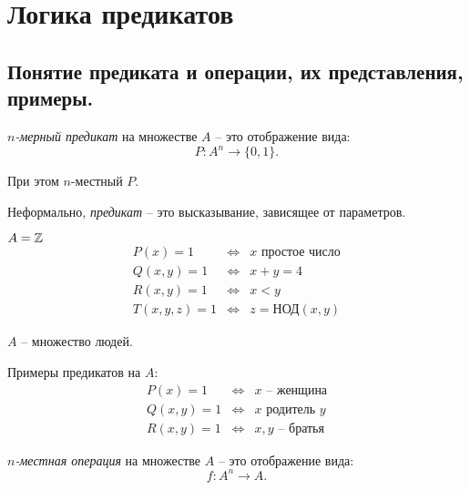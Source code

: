 \section{Логика предикатов}

\subsection{Понятие предиката и операции, их представления, примеры.}

\begin{definition}
    \emph{$ n $-мерный предикат} на множестве $ A $ -- это отображение вида:
    \[
        P: A^n \rightarrow\{0,1\}.
    \]

    При этом $ n $-местный $ P $.

    Неформально, \emph{предикат} -- это высказывание, зависящее от параметров.
\end{definition}

\begin{example}
    $ A = \mathbb{Z} $
    \[
        \begin{array}{lll}
            P(x) = 1     & \iff & x \text{ простое число} \\
            Q(x,y) = 1   & \iff & x + y = 4               \\
            R(x,y) = 1   & \iff & x < y                   \\
            T(x,y,z) = 1 & \iff & z = \text{НОД}(x,y)
        \end{array}
    \]
\end{example}

\begin{example}
    $ A $ -- множество людей.

    Примеры предикатов на $ A $:
    \[
        \begin{array}{lll}
            P(x) = 1   & \iff & x \text{ -- женщина}  \\
            Q(x,y) = 1 & \iff & x \text{ родитель } y \\
            R(x,y) = 1 & \iff & x,y \text{ -- братья}
        \end{array}
    \]
\end{example}

\begin{definition}
    \emph{$ n $-местная операция} на множестве $ A $ -- это отображение вида:
    \[
        f: A^n \rightarrow A.
    \]
\end{definition}

